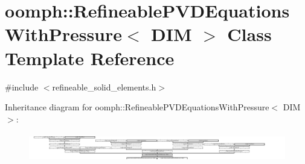 \hypertarget{classoomph_1_1RefineablePVDEquationsWithPressure}{}\section{oomph\+:\+:Refineable\+P\+V\+D\+Equations\+With\+Pressure$<$ D\+IM $>$ Class Template Reference}
\label{classoomph_1_1RefineablePVDEquationsWithPressure}


{\ttfamily \#include $<$refineable\+\_\+solid\+\_\+elements.\+h$>$}

Inheritance diagram for oomph\+:\+:Refineable\+P\+V\+D\+Equations\+With\+Pressure$<$ D\+IM $>$\+:\begin{figure}[H]
\begin{center}
\leavevmode
\includegraphics[height=1.262887cm]{classoomph_1_1RefineablePVDEquationsWithPressure}
\end{center}
\end{figure}
